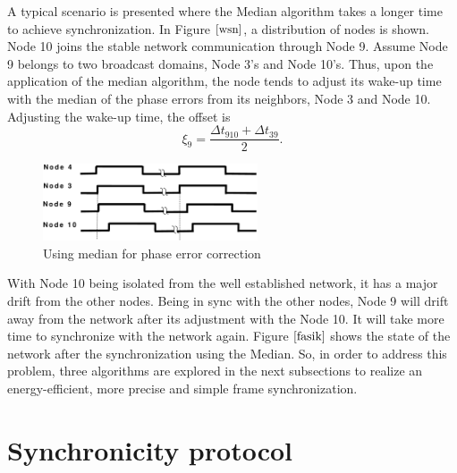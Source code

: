 \documentclass[journal]{IEEEtran}
\begin{document}
\newline A typical scenario is presented where the Median algorithm takes a longer time to achieve synchronization. In Figure $\ref{wsn}$, a distribution of nodes is shown. Node 10 joins  the stable network communication through Node 9. Assume Node 9 belongs to two broadcast domains, Node 3's and Node 10's. Thus, upon the application of the median algorithm, the node tends to adjust its wake-up time with the median of the phase errors from its neighbors, Node 3 and Node 10. Adjusting the wake-up time, the offset is
\begin{equation}
\xi_9 = \frac{\Delta t_{910} + \Delta t_{39}}{2}.
\end{equation}
\begin{figure}[t]
\centering
\includegraphics[width= 2.5in]{offsetpic}
\caption{Using median for phase error correction} \label{fasik}
\end{figure}
\noindent With Node 10 being isolated from the well established
network, it has a major drift from the other nodes. Being in sync
with the other nodes, Node 9 will drift away from the network after
its adjustment with the Node 10. It will take more time to
synchronize with the network again. Figure $\ref{fasik}$ shows the state of the network after the
synchronization using the Median.
\newline So, in order to address this problem, three algorithms are explored in the next subsections to realize an energy-efficient, more precise and simple frame synchronization.
\section{\textbf{Synchronicity protocol}}
\end{document}
